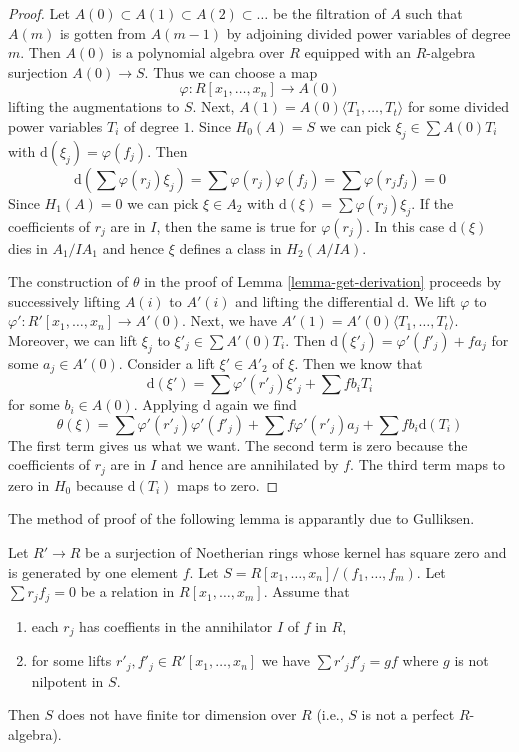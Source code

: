 \begin{proof}
Let $A(0) \subset A(1) \subset A(2) \subset \ldots$ be the filtration
of $A$ such that $A(m)$ is gotten from $A(m - 1)$ by adjoining divided
power variables of degree $m$. Then $A(0)$ is a polynomial algebra
over $R$ equipped with an $R$-algebra surjection $A(0) \to S$.
Thus we can choose a map
$$
\varphi : R[x_1, \ldots, x_n] \to A(0)
$$
lifting the augmentations to $S$.
Next, $A(1) = A(0)\langle T_1, \ldots, T_t \rangle$ for some divided
power variables $T_i$ of degree $1$. Since $H_0(A) = S$ we
can pick $\xi_j \in \sum A(0)T_i$ with $\text{d}(\xi_j) = \varphi(f_j)$.
Then
$$
\text{d}\left(\sum \varphi(r_j) \xi_j\right) =
\sum  \varphi(r_j) \varphi(f_j) =  \sum \varphi(r_jf_j) = 0
$$
Since $H_1(A) = 0$ we can pick $\xi \in A_2$ with
$\text{d}(\xi) = \sum \varphi(r_j) \xi_j$.
If the coefficients of $r_j$ are in $I$, then the same
is true for $\varphi(r_j)$. In this case
$\text{d}(\xi)$ dies in $A_1/IA_1$ and
hence $\xi$ defines a class in $H_2(A/IA)$.

\medskip\noindent
The construction of $\theta$ in the proof of Lemma \ref{lemma-get-derivation}
proceeds by successively lifting $A(i)$ to $A'(i)$ and lifting the
differential $\text{d}$. We lift $\varphi$
to $\varphi' : R'[x_1, \ldots, x_n] \to A'(0)$.
Next, we have $A'(1) = A'(0)\langle T_1, \ldots, T_t\rangle$.
Moreover, we can lift $\xi_j$ to $\xi'_j \in \sum A'(0)T_i$.
Then $\text{d}(\xi'_j) = \varphi'(f'_j) + f a_j$ for some
$a_j \in A'(0)$.
Consider a lift $\xi' \in A'_2$ of $\xi$.
Then we know that
$$
\text{d}(\xi') = \sum \varphi'(r'_j)\xi'_j + \sum fb_iT_i
$$
for some $b_i \in A(0)$. Applying $\text{d}$ again we find
$$
\theta(\xi) = \sum \varphi'(r'_j)\varphi'(f'_j) +
\sum f \varphi'(r'_j) a_j + \sum fb_i \text{d}(T_i)
$$
The first term gives us what we want. The second term is zero
because the coefficients of $r_j$ are in $I$ and hence are
annihilated by $f$. The third term maps to zero in $H_0$
because $\text{d}(T_i)$ maps to zero.
\end{proof}

\noindent
The method of proof of the following lemma is apparantly due to Gulliksen.

\begin{lemma}
\label{lemma-not-finite-pd}
Let $R' \to R$ be a surjection of Noetherian rings whose kernel has square
zero and is generated by one element $f$. Let
$S = R[x_1, \ldots, x_n]/(f_1, \ldots, f_m)$.
Let $\sum r_j f_j = 0$ be a relation in $R[x_1, \ldots, x_m]$.
Assume that
\begin{enumerate}
\item each $r_j$ has coeffients in the annihilator $I$ of $f$ in $R$,
\item for some lifts $r'_j, f'_j \in R'[x_1, \ldots, x_n]$ we have
$\sum r'_j f'_j = gf$ where $g$ is not nilpotent in $S$.
\end{enumerate}
Then $S$ does not have finite tor dimension over $R$ (i.e., $S$ is not
a perfect $R$-algebra).
\end{lemma}


